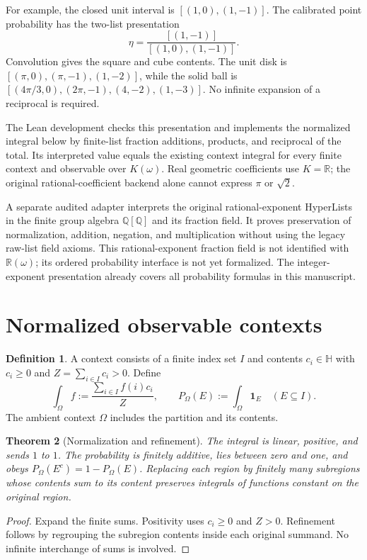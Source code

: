 \documentclass[11pt]{article}
\newtheorem{theorem}{Theorem}[section]
\theoremstyle{definition}
\newtheorem{definition}[theorem]{Definition}
\theoremstyle{remark}
\newcommand{\R}{\mathbb R}
\newcommand{\HH}{\mathbb H}
\begin{document}
For example, the closed unit interval is $[(1,0),(1,-1)]$.
The calibrated point probability has the two-list presentation
\[
 \eta=\frac{[(1,-1)]}{[(1,0),(1,-1)]}.
\]
Convolution gives the square and cube contents. The unit disk is
$[(\pi,0),(\pi,-1),(1,-2)]$, while the solid ball is
$[(4\pi/3,0),(2\pi,-1),(4,-2),(1,-3)]$.
No infinite expansion of a reciprocal is required.

The Lean development checks this presentation and implements the normalized
integral below by finite-list fraction additions, products, and reciprocal
of the total. Its interpreted value equals the existing context integral
for every finite context and observable over $K(\omega)$.
Real geometric coefficients use $K=\R$; the original rational-coefficient
backend alone cannot express $\pi$ or $\sqrt2$.

A separate audited adapter interprets the original rational-exponent
HyperLists in the finite group algebra $\mathbb Q[\mathbb Q]$ and its fraction
field. It proves preservation of normalization, addition, negation, and
multiplication without using the legacy raw-list field axioms. This
rational-exponent fraction field is not identified with $\R(\omega)$; its ordered
probability interface is not yet formalized. The integer-exponent
presentation already covers all probability formulas in this manuscript.

\section{Normalized observable contexts}
\begin{definition}
A context consists of a finite index set $I$ and contents $c_i\in\HH$
with $c_i\geq0$ and $Z=\sum_{i\in I}c_i>0$. Define
\[
 \int_{\Omega} f := \frac{\sum_{i\in I} f(i)c_i}{Z},\qquad
 P_\Omega(E):=\int_\Omega\mathbf1_E\quad(E\subseteq I).
\]
The ambient context $\Omega$ includes the partition and its contents.
\end{definition}

\begin{theorem}[Normalization and refinement]
The integral is linear, positive, and sends $1$ to $1$. The probability
is finitely additive, lies between zero and one, and obeys
$P_\Omega(E^c)=1-P_\Omega(E)$. Replacing each region by finitely many
subregions whose contents sum to its content preserves integrals of
functions constant on the original region.
\end{theorem}
\begin{proof}
Expand the finite sums. Positivity uses $c_i\geq0$ and $Z>0$.
Refinement follows by regrouping the subregion contents inside each
original summand. No infinite interchange of sums is involved.
\end{proof}
\end{document}
